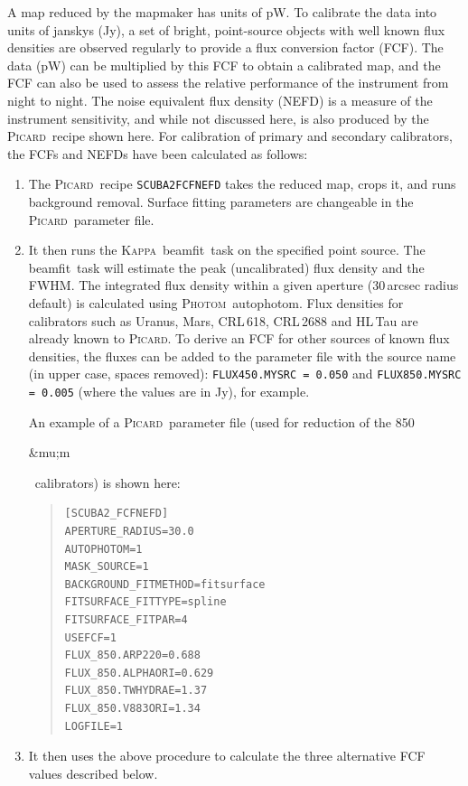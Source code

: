 \documentclass[twoside,11pt]{article}
\newcommand{\micron}{\mbox{\,${\umu}$m}}            %
\newcommand{\xref}[3]{#1}
\renewcommand{\_}{\texttt{\symbol{95}}}
\newenvironment{myquote}{\begin{quote}\begin{small}}{\end{small}\end{quote}}
\newcommand{\Kappa}{\xref{\textsc{Kappa}}{sun95}{}}
\newcommand{\picard}{\xref{\textsc{Picard}}{sun231}{}}
\newcommand{\photom}{\xref{\textsc{Photom}}{sun45}{}}
\newcommand{\drrecipe}[1]{\texttt{#1}}
\newcommand{\task}[1]{\textsf{#1}}
\newcommand{\beamfit}{\xref{\task{beamfit}}{sun95}{BEAMFIT}}
\newcommand{\autophotom}{\xref{\task{autophotom}}{sun45}{AUTOPHOTOM}}
\renewcommand{\micron}{\begin{rawhtml}&mu;m\end{rawhtml}}
\begin{document}
A map reduced by the mapmaker has units of pW. To calibrate the data
into units of janskys (Jy), a set of bright, point-source objects with
well known flux densities are observed regularly to provide a flux
conversion factor (FCF). The data (pW) can be multiplied by this FCF
to obtain a calibrated map, and the FCF can also be used to assess the
relative performance of the instrument from night to night. The noise
equivalent flux density (NEFD) is a measure of the instrument
sensitivity, and while not discussed here, is also produced by the
\picard\ recipe shown here. For calibration of primary and secondary
calibrators, the FCFs and NEFDs have been calculated as follows:
\begin{enumerate}
\item{The \picard\ recipe \drrecipe{SCUBA2\_FCFNEFD} takes the reduced
  map, crops it, and runs background removal. Surface fitting
  parameters are changeable in the \picard\ parameter file.}
\item{It then runs the \Kappa\ \beamfit\ task on the specified point
  source. The \beamfit\ task will estimate the peak (uncalibrated)
  flux density and the FWHM. The integrated flux density within a
  given aperture (30\,arcsec radius default) is calculated using
  \photom\ \autophotom. Flux densities for calibrators such as Uranus,
  Mars, CRL\,618, CRL\,2688 and HL\,Tau are already known to
  \picard. To derive an FCF for other sources of known flux densities,
  the fluxes can be added to the parameter file with the source name
  (in upper case, spaces removed): \texttt{FLUX\_450.MYSRC = 0.050}
  and \texttt{FLUX\_850.MYSRC = 0.005} (where the values are in Jy),
  for example. }

  An example of a \picard\ parameter file (used for reduction of the
  850\micron\ calibrators) is shown here:

\begin{myquote}
\begin{verbatim}
[SCUBA2_FCFNEFD]
APERTURE_RADIUS=30.0
AUTOPHOTOM=1
MASK_SOURCE=1
BACKGROUND_FITMETHOD=fitsurface
FITSURFACE_FITTYPE=spline
FITSURFACE_FITPAR=4
USEFCF=1
FLUX_850.ARP220=0.688
FLUX_850.ALPHAORI=0.629
FLUX_850.TWHYDRAE=1.37
FLUX_850.V883ORI=1.34
LOGFILE=1
\end{verbatim}
\end{myquote}

\item {It then uses the above procedure to calculate the three
  alternative FCF values described below.}
\end{enumerate}
\end{document}
